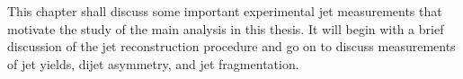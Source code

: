 This chapter shall discuss some important experimental jet measurements that motivate the study of the main analysis in this thesis. It will begin with a brief discussion of the jet reconstruction procedure and go on to discuss measurements of jet yields, dijet asymmetry, and jet fragmentation. 

%
%
%
%
%
